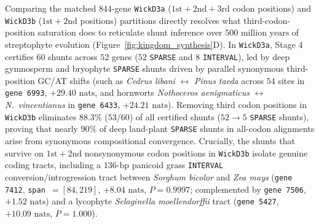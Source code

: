 \documentclass[11pt,a4paper]{article}
\begin{document}
Comparing the matched $844$-gene \texttt{WickD3a} ($1\text{st}+2\text{nd}+3\text{rd}$ codon positions) and \texttt{WickD3b} ($1\text{st}+2\text{nd}$ positions) partitions directly resolves what third-codon-position saturation does to reticulate shunt inference over $500\text{ million years}$ of streptophyte evolution (Figure~\ref{fig:kingdom_synthesis}D). In \texttt{WickD3a}, Stage 4 certifies $60$ shunts across $52$ genes ($52$ \texttt{SPARSE} and $8$ \texttt{INTERVAL}), led by deep gymnosperm and bryophyte \texttt{SPARSE} shunts driven by parallel synonymous third-position GC/AT shifts (such as \textit{Cedrus libani} $\leftrightarrow$ \textit{Pinus taeda} across $54$ sites in \texttt{gene 6993}, $+29.40\text{ nats}$, and hornworts \textit{Nothoceros aenigmaticus} $\leftrightarrow$ \textit{N.\ vincentianus} in \texttt{gene 6433}, $+24.21\text{ nats}$). Removing third codon positions in \texttt{WickD3b} eliminates $88.3\%$ ($53 / 60$) of all certified shunts ($52 \to 5$ \texttt{SPARSE} shunts), proving that nearly $90\%$ of deep land-plant \texttt{SPARSE} shunts in all-codon alignments arise from synonymous compositional convergence. Crucially, the shunts that survive on $1\text{st}+2\text{nd}$ nonsynonymous codon positions in \texttt{WickD3b} isolate genuine coding tracts, including a $136\text{-bp}$ panicoid grass \texttt{INTERVAL} conversion/introgression tract between \textit{Sorghum bicolor} and \textit{Zea mays} (\texttt{gene 7412}, \texttt{span}~$=[84, 219]$, $+8.04\text{ nats}$, $P = 0.9997$; complemented by \texttt{gene 7506}, $+1.52\text{ nats}$) and a lycophyte \textit{Selaginella moellendorffii} tract (\texttt{gene 5427}, $+10.09\text{ nats}$, $P = 1.000$).
\end{document}
